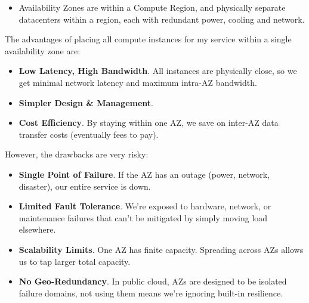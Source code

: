 \begin{enumerate}
\begin{itemize}
        \item Availability Zones are within a Compute Region, and physically separate datacenters within a region, each with redundant power, cooling and network.
    \end{itemize}
    The advantages of placing all compute instances for my service within a single availability zone are:
    \begin{itemize}
        \item \textbf{Low Latency, High Bandwidth}. All instances are physically close, so we get minimal network latency and maximum intra-AZ bandwidth.
        \item \textbf{Simpler Design \& Management}.
        \item \textbf{Cost Efficiency}. By staying within one AZ, we save on inter-AZ data transfer costs (eventually fees to pay).
    \end{itemize}
    However, the drawbacks are very risky:
    \begin{itemize}
        \item \textbf{Single Point of Failure}. If the AZ has an outage (power, network, disaster), our entire service is down.
        \item \textbf{Limited Fault Tolerance}. We're exposed to hardware, network, or maintenance failures that can't be mitigated by simply moving load elsewhere.
        \item \textbf{Scalability Limits}. One AZ has finite capacity. Spreading across AZs allows us to tap larger total capacity.
        \item \textbf{No Geo-Redundancy}. In public cloud, AZs are designed to be isolated failure domains, not using them means we're ignoring built-in resilience.
    \end{itemize}
\end{enumerate}